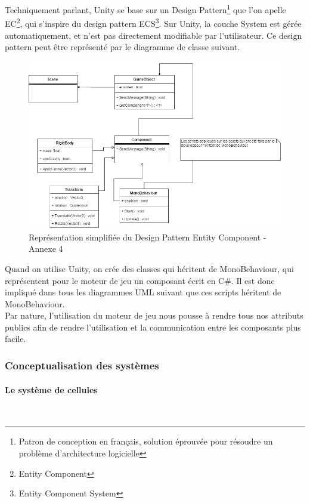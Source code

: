 \documentclass[a4paper]{article}
\begin{document}
    Techniquement parlant, Unity se base sur un Design Pattern\footnote{Patron de conception en français, solution éprouvée pour résoudre un problème d'architecture logicielle} que l'on apelle EC\footnote{Entity Component}, qui s'inspire du design pattern ECS\footnote{Entity Component System}. Sur Unity, la couche System est gérée automatiquement, et n'est pas directement modifiable par l'utilisateur. Ce design pattern peut être représenté par le diagramme de classe suivant. \\

    \begin{figure}[H]
        \centering
        \includegraphics[scale=0.45]{img/DiagClasseEntityComponent}
        \caption{Représentation simplifiée du Design Pattern Entity Component - Annexe 4}
    \end{figure} 

    Quand on utilise Unity, on crée des classes qui héritent de MonoBehaviour, qui représentent pour le moteur de jeu un composant écrit en C\#. Il est donc impliqué dans tous les diagrammes UML suivant que ces scripts héritent de MonoBehaviour. \\

    Par nature, l'utilisation du moteur de jeu nous pousse à rendre tous nos attributs publics afin de rendre l'utilisation et la communication entre les composants plus facile. \\

    \subsubsection{Conceptualisation des systèmes}

    \paragraph{Le système de cellules} \mbox{} \\
\end{document}
